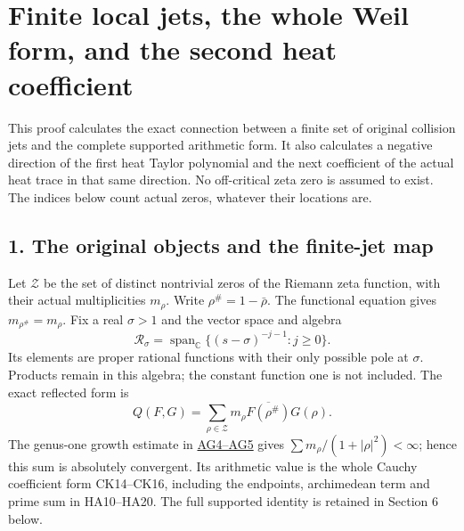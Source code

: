 \documentclass[
  10pt,
  a4paper,
]{article}
\begin{document}
\clearpage

\section{Finite local jets, the whole Weil form, and the second heat
coefficient}\label{finite-local-jets-the-whole-weil-form-and-the-second-heat-coefficient}

This proof calculates the exact connection between a finite set of
original collision jets and the complete supported arithmetic form. It
also calculates a negative direction of the first heat Taylor polynomial
and the next coefficient of the actual heat trace in that same
direction. No off-critical zeta zero is assumed to exist. The indices
below count actual zeros, whatever their locations are.

\subsection{1. The original objects and the finite-jet
map}\label{the-original-objects-and-the-finite-jet-map}

Let \(\mathcal Z\) be the set of distinct nontrivial zeros of the
Riemann zeta function, with their actual multiplicities \(m_\rho\).
Write \(\rho^\#=1-\bar\rho\). The functional equation gives
\(m_{\rho^\#}=m_\rho\). Fix a real \(\sigma>1\) and the vector space and
algebra \[
\mathcal R_\sigma=\operatorname{span}_{\mathbb C}\{(s-\sigma)^{-j-1}:j\ge0\}.
\tag{FJ1}
\] Its elements are proper rational functions with their only possible
pole at \(\sigma\). Products remain in this algebra; the constant
function one is not included. The exact reflected form is \[
Q(F,G)=\sum_{\rho\in\mathcal Z}m_\rho
 \overline{F(\rho^\#)}G(\rho).
\tag{FJ2}
\] The genus-one growth estimate in
\href{ACTUAL_HEAT_ZERO_DISTRIBUTION_VARIATION.md}{AG4--AG5} gives
\(\sum m_\rho/(1+|\rho|^2)<\infty\); hence this sum is absolutely
convergent. Its arithmetic value is the whole Cauchy coefficient form
CK14--CK16, including the endpoints, archimedean term and prime sum in
HA10--HA20. The full supported identity is retained in Section 6 below.
\end{document}
